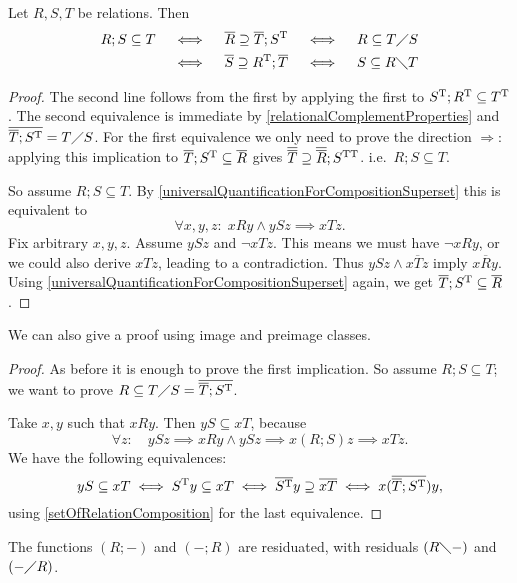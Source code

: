 \begin{proposition} \label{SchroderRule}
Let $R,S,T$ be relations. Then
\begin{align*}
R;S \subseteq T &\quad\iff\quad \overline{R} \supseteq \overline{T};S^{\mathrm{T}} \quad\iff\quad R \subseteq T\diagup S \\
&\quad\iff\quad \overline{S} \supseteq R^{\mathrm{T}} ; \overline{T} \quad\iff\quad S \subseteq R\diagdown T
\end{align*}
\end{proposition}
\begin{proof}
The second line follows from the first by applying the first to $S^{\mathrm{T}};R^{\mathrm{T}} \subseteq T^{\mathrm{T}}$. The second equivalence is immediate by \ref{relationalComplementProperties} and $\overline{\overline{T};S^{\mathrm{T}}} = T\diagup S$. For the first equivalence we only need to prove the direction $\Rightarrow$: applying this implication to $\overline{T};S^{\mathrm{T}} \subseteq \overline{R}$ gives $\overline{\overline{T}}\supseteq \overline{\overline{R}};S^{\mathrm{T}\mathrm{T}}$. i.e.\ $R;S \subseteq T$.

So assume $R;S \subseteq T$. By \ref{universalQuantificationForCompositionSuperset} this is equivalent to
\[ \forall x,y,z:\; xRy \land ySz \implies xTz. \]
Fix arbitrary $x,y,z$. Assume $ySz$ and $\neg xTz$. This means we must have $\neg xRy$, or we could also derive $xTz$, leading to a contradiction. Thus $ySz \land x\overline{T}z$ imply $x\overline{R}y$. Using \ref{universalQuantificationForCompositionSuperset} again, we get $\overline{T};S^{\mathrm{T}} \subseteq \overline{R}$.
\end{proof}
We can also give a proof using image and preimage classes.
\begin{proof}
As before it is enough to prove the first implication. So assume $R;S \subseteq T$; we want to prove $R \subseteq T\diagup S = \overline{\overline{T}; S^{\mathrm{T}}}$.

Take $x,y$ such that $xRy$. Then $yS \subseteq xT$, because
\[ \forall z: \quad ySz \implies xRy\land ySz \implies x(R;S)z \implies xTz. \]
We have the following equivalences:
\[ yS \subseteq xT \iff S^{\mathrm{T}} y \subseteq xT \iff \overline{S^{\mathrm{T}}}y \supseteq \overline{xT} \iff x(\overline{\overline{T}; S^{\mathrm{T}}})y, \]
using \ref{setOfRelationComposition} for the last equivalence.
\end{proof}
\begin{corollary} \label{relationCompositionResiduated}
The functions $(R;-)$ and $(-;R)$ are residuated, with residuals $(R\diagdown -)$ and $(-\diagup R)$.
\end{corollary}
